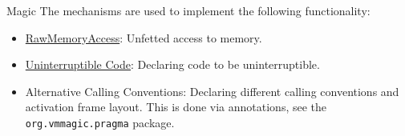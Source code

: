 \begin{chapter}{Magic}
The mechanisms are used to implement the following functionality:
\begin{itemize}
  \item \hyperref[sec:rawmemoryaccess]{RawMemoryAccess}: Unfetted access to memory.
  \item \hyperref[sec:uninterruptiblecode]{Uninterruptible Code}: Declaring code to be uninterruptible.
  \item Alternative Calling Conventions: Declaring different calling conventions and activation frame layout. This is done via annotations, see the \texttt{org.vm\-ma\-gic.prag\-ma} package.
\end{itemize}









\end{chapter}
